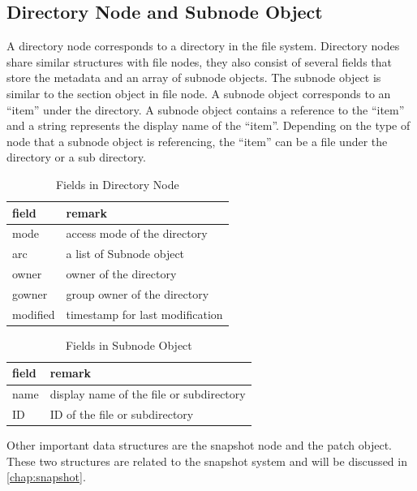 \subsection{Directory Node and Subnode Object}

     A directory node corresponds to a directory in the file system. Directory nodes share similar structures with file nodes, they also consist of several fields that store the metadata and an array of subnode objects. The subnode object is similar to the section object in file node. A subnode object corresponds to an ``item'' under the directory. A subnode object contains a reference to the ``item'' and a string represents the display name of the ``item''. Depending on the type of node that a subnode object is referencing, the ``item'' can be a file under the directory or a sub directory.

\begin{table}[t]
\begin{center}
\caption{Fields in Directory Node}
\begin{tabular}{ll}
\toprule
field & remark\\
\midrule
mode & access mode of the directory\\
arc & a list of Subnode object\\
owner & owner of the directory\\
gowner & group owner of the directory\\
modified & timestamp for last modification\\
\bottomrule
\end{tabular}
\end{center}
\label{tab:dir_fields}
\end{table}

\begin{table}[t]
\begin{center}
\caption{Fields in Subnode Object}
\begin{tabular}{ll}
\toprule
field & remark\\
\midrule
name & display name of the file or subdirectory\\
ID & ID of the file or subdirectory\\
\bottomrule
\end{tabular}
\end{center}
\label{tab:subnode_fields}
\end{table}

    Other important data structures are the snapshot node and the patch object. These two structures are related to the snapshot system and will be discussed in \cref{chap:snapshot}.

